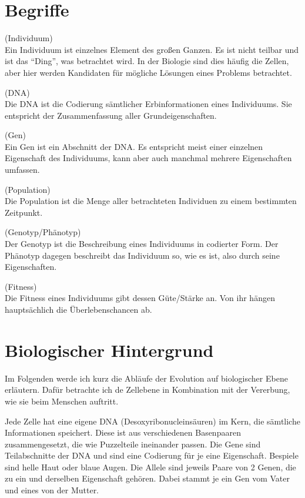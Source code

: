 \section{Begriffe}
\begin{mydef}(Individuum)\\
	Ein Individuum ist einzelnes Element des großen Ganzen. Es ist nicht teilbar und ist das "`Ding"', was betrachtet wird. In der Biologie sind dies häufig die Zellen, aber hier werden Kandidaten für mögliche Lösungen eines Problems betrachtet.
\end{mydef}
\begin{mydef}(DNA)\\
	Die DNA ist die  Codierung sämtlicher Erbinformationen eines Individuums. Sie entspricht der Zusammenfassung aller Grundeigenschaften.
\end{mydef}
\begin{mydef}(Gen)\\
	Ein Gen ist ein Abschnitt der DNA. Es entspricht meist einer einzelnen Eigenschaft des Individuums, kann aber auch manchmal mehrere Eigenschaften umfassen.
\end{mydef}
\begin{mydef}(Population)\\
	Die Population ist die Menge aller betrachteten Individuen zu einem bestimmten Zeitpunkt.
\end{mydef}
\begin{mydef}(Genotyp/Phänotyp)\\
	Der Genotyp ist die Beschreibung eines Individuums in codierter Form. Der Phänotyp dagegen beschreibt das Individuum so, wie es ist, also durch seine Eigenschaften.
\end{mydef}
\begin{mydef}(Fitness)\\
	Die Fitness eines Individuums gibt dessen Güte/Stärke an. Von ihr hängen hauptsächlich die Überlebenschancen ab.
\end{mydef}

\section{Biologischer Hintergrund}
Im Folgenden werde ich kurz die Abläufe der Evolution auf biologischer Ebene erläutern. Dafür betrachte ich de Zellebene in Kombination mit der Vererbung, wie sie beim Menschen auftritt.

Jede Zelle hat eine eigene DNA (Desoxyribonucleinsäuren) im Kern, die sämtliche Informationen speichert. Diese ist aus verschiedenen Basenpaaren zusammengesetzt, die wie Puzzelteile ineinander passen. Die Gene sind Teilabschnitte der DNA und sind eine Codierung für je eine Eigenschaft. Bespiele sind helle Haut oder blaue Augen. Die Allele sind jeweils Paare von 2 Genen, die zu ein und derselben Eigenschaft gehören. Dabei stammt je ein Gen vom Vater und eines von der Mutter.

